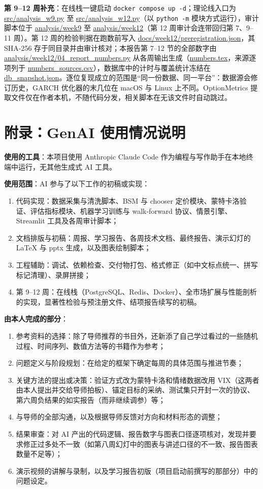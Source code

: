\documentclass[11pt]{ctexart}
\begin{document}
\textbf{第 9--12 周补充}：在线栈一键启动 \texttt{docker compose up -d}；理论线入口为 \url{src/analysis_w9.py} 至 \url{src/analysis_w12.py}（以 \texttt{python -m} 模块方式运行），审计脚本位于 \url{analysis/week9} 至 \url{analysis/week12}（第 12 周审计会连带回归第 7、9--11 周）。第 12 周的检验判据在跑数前写入 \url{docs/week12/preregistration.json}，其 SHA-256 存于同目录并由审计核对；本报告第 7--12 节的全部数字由 \url{analysis/week12/04_report_numbers.py} 从各周输出生成（\url{numbers.tex}，来源逐项列于 \url{numbers_sources.csv}），数据库中的计时与覆盖统计冻结在 \url{db_snapshot.json}。逐位复现成立的范围是“同一份数据、同一平台”：数据源会修订历史，GARCH 优化器的末几位在 macOS 与 Linux 上不同。OptionMetrics 提取文件仅在作者本机，不随代码分发，相关脚本在无该文件时自动跳过。

\section*{附录：GenAI 使用情况说明}
\textbf{使用的工具}：本项目使用 Anthropic Claude Code 作为编程与写作助手在本地终端中运行，无其他生成式 AI 工具。

\textbf{使用范围}：AI 参与了以下工作的初稿或实现：
\begin{enumerate}
  \item 代码实现：数据采集与清洗脚本、BSM 与 chooser 定价模块、蒙特卡洛验证、评估指标模块、机器学习训练与 walk-forward 协议、情景引擎、Streamlit 工具及各周审计脚本；
  \item 文档排版与初稿：周报、学习报告、各周技术文档、最终报告、演示幻灯的 LaTeX 与 pptx 生成，以及图表绘制脚本；
  \item 工程辅助：调试、依赖检查、交付物打包、格式修正（如中文标点统一、拼写标记清理）、录屏拼接；
  \item 第 9--12 周：在线栈（PostgreSQL、Redis、Docker）、全市场扩展与性能剖析的实现，显著性检验与预注册文件、结项报告续写的初稿。
\end{enumerate}

\textbf{由本人完成的部分}：
\begin{enumerate}
  \item 参考资料的选择：除了导师推荐的书目外，还新添了自己学过看过的一些随机过程、时间序列、数值方法等的书籍作为参考；
  \item 问题定义与阶段规划：在给定的框架下确定每周的具体范围与推进节奏；
  \item 关键方法的提出或决策：验证方式改为蒙特卡洛和情绪数据改用 VIX（这两者由本人提出并交给导师拍板）、锚定目标的采纳、测试集只开封一次的协议、第六周负结果的如实报告（而非继续调参）等；
  \item 与导师的全部沟通，以及根据导师反馈对方向和材料形态的调整；
  \item 结果审查：对 AI 产出的代码逻辑、报告数字与图表口径逐项核对，发现并要求修正过多处不一致（如第八周幻灯中的图表与讲述口径的不一致、报告图表数量不足等）；
  \item 演示视频的讲解与录制，以及学习报告初版（项目启动前撰写的那部分）中的问题设定。
\end{enumerate}
\end{document}
